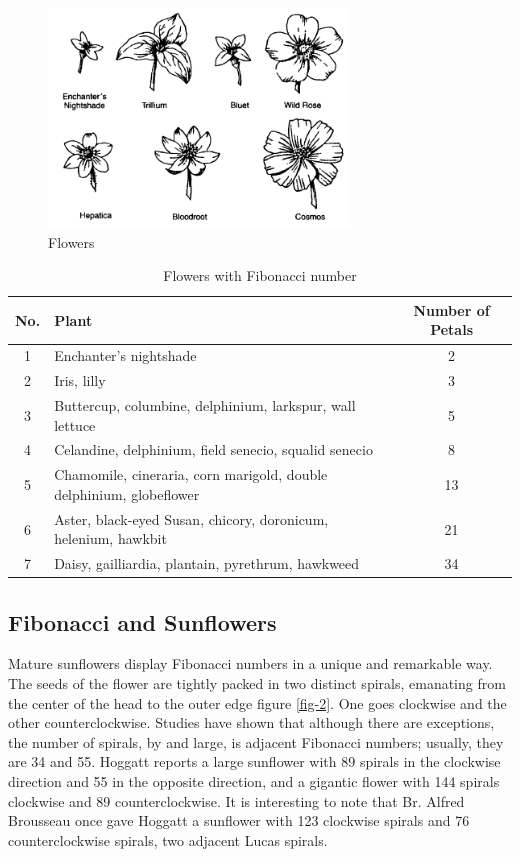\documentclass[10pt]{report}
\begin{document}
{\begin{figure}
\centering
\includegraphics[height=5 cm, width=8cm]{flowers.png}
\caption{Flowers}
\label{fig-1}
\end{figure}

\begin{table}
	\centering
	\begin{tabular}{ | c |  p{7 cm} | c | } 
		\hline
		No. & Plant  &Number of Petals
		 \\ 
		\hline
		1&Enchanter's nightshade &2 \\
		\hline
2&  Iris, lilly & 3 \\
\hline
3 & Buttercup, columbine, delphinium, larkspur, wall lettuce & 5 \\
\hline
4 & Celandine, delphinium, field senecio, squalid senecio & 8 \\
\hline
5 & Chamomile, cineraria, corn marigold, double delphinium, globeflower & 13 \\
\hline
6 & Aster, black-eyed Susan, chicory, doronicum, helenium, hawkbit & 21 \\
\hline
7& Daisy, gailliardia, plantain, pyrethrum, hawkweed & 34 \\		
	\hline
	\end{tabular}
\caption{Flowers with Fibonacci number}
\label{tab-1}
	\end{table}
\subsection{Fibonacci  and Sunflowers}
Mature sunflowers display Fibonacci numbers in a unique and remarkable way. The seeds of the flower are tightly packed in two distinct spirals, emanating from the center of the head to the outer edge figure \ref{fig-2}. One goes clockwise and the other counterclockwise. Studies have shown that although there are exceptions, the number of spirals, by and large, is adjacent Fibonacci numbers; usually, they are 34 and 55. Hoggatt reports a large sunflower with 89 spirals in the clockwise direction and 55
in the opposite direction, and a gigantic flower with 144 spirals clockwise and 89 counterclockwise. It is interesting to note that Br. Alfred Brousseau once gave Hoggatt a sunflower with 123 clockwise spirals and 76 counterclockwise spirals, two adjacent Lucas spirals.

}
\end{document}
